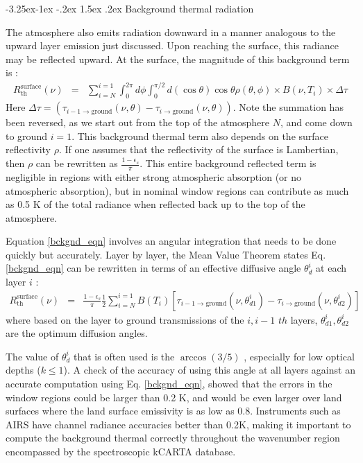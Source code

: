 \documentclass[11pt]{article}
\makeatletter
\newcommand{\kc}{\textsf{kCARTA}\xspace}
\renewcommand{\subsection}{\@startsection{subsection}{2}{\z@}%
                                     {-3.25ex\@plus -1ex \@minus -.2ex}%
                                     {1.5ex \@plus .2ex}%
                                     {\reset@font\normalsize\bfseries}}
\makeatother
\begin{document}
\subsection{Background thermal radiation}

The atmosphere also emits radiation downward in a manner analogous to
the upward layer emission just discussed. Upon reaching the surface,
this radiance may be reflected upward. At the surface, the magnitude
of this background term is :
\begin{eqnarray}
  R_{\text{th}}^{\text{surface}}(\nu) & = & \sum_{i=N}^{i=1}
  \int_{0}^{2\pi}d\phi
  \int_{0}^{\pi/2} d(\cos\theta) \cos\theta \rho(\theta,\phi)
  \times B(\nu,T_{i}) \times \Delta \tau
  \label{bckgnd_eqn}
\end{eqnarray}
Here $ \Delta \tau = (\tau_{i-1 \rightarrow
  \text{ground}}(\nu,\theta)- \tau_{i \rightarrow
  \text{ground}}(\nu,\theta))$.  Note the summation has been reversed,
as we start out from the top of the atmosphere $N$, and come down to
ground $i=1$.  This background thermal term also depends on the
surface reflectivity $\rho$.  If one assumes that the reflectivity of
the surface is Lambertian, then $\rho$ can be rewritten as $\frac{1 -
  \epsilon_{s}}{\pi}$. This entire background reflected term is
negligible in regions with either strong atmospheric absorption (or no
atmospheric absorption), but in nominal window regions can contribute
as much as 0.5 K of the total radiance when reflected back up to the
top of the atmosphere.

Equation \ref{bckgnd_eqn} involves an angular integration that needs
to be done quickly but accurately. Layer by layer, the Mean Value
Theorem states Eq. \ref{bckgnd_eqn} can be rewritten in terms of an
effective diffusive angle $\theta^{i}_{d}$ at each layer $i$ :
\begin{eqnarray*}
  R_{\text{th}}^{\text{surface}}(\nu) & =
  & \frac{1 - \epsilon_{s}}{\pi} \frac{1}{2} \sum_{i=N}^{i=1}
  B(T_{i}) \left[ \tau_{i-1 \rightarrow \text{ground}}
    (\nu,\theta^{i}_{d1})-\tau_{i \rightarrow \text{ground}}(\nu,\theta^{i}_{d2}) \right]
\end{eqnarray*}
where based on the layer to ground transmissions of the $i,i-1$ $th$
layers, $\theta^{i}_{d1},\theta^{i}_{d2}$ are the optimum diffusion
angles.

The value of $\theta^{i}_{d}$ that is often used is the $\arccos(3/5)$
\cite{lio:80}, especially for low optical depths ($k \le 1$).  A check
of the accuracy of using this angle at all layers against an accurate
computation using Eq. \ref{bckgnd_eqn}, showed that the errors in the
window regions could be larger than 0.2 K, and would be even larger
over land surfaces where the land surface emissivity is as low as
0.8. Instruments such as AIRS have channel radiance accuracies better
than 0.2K, making it important to compute the background thermal
correctly throughout the wavenumber region encompassed by the
spectroscopic \kc database.
\end{document}
